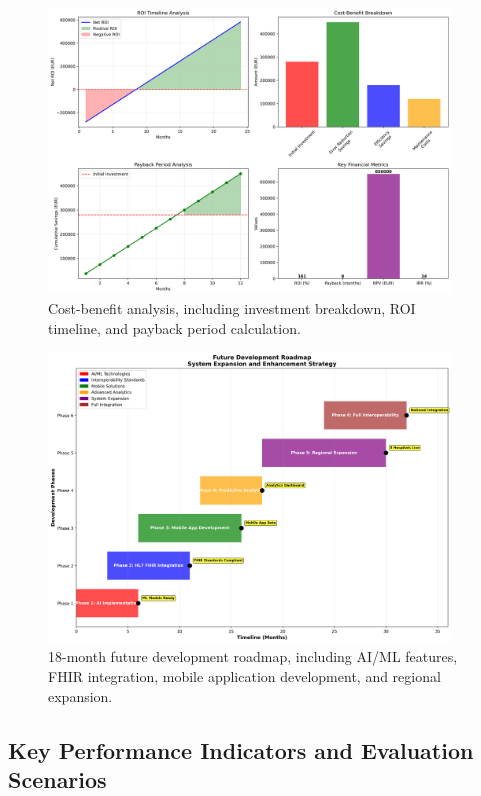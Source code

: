 \begin{figure}[htbp]
    \centering
    \includegraphics[width=0.95\textwidth]{images/generated/roi_analysis.png}
    \caption{Cost-benefit analysis, including investment breakdown, ROI timeline, and payback period calculation.}
    \label{fig:roi-analysis}
\end{figure}

\begin{figure}[htbp]
    \centering
    \includegraphics[width=0.95\textwidth]{images/generated/future_roadmap.png}
    \caption{18-month future development roadmap, including AI/ML features, FHIR integration, mobile application development, and regional expansion.}
    \label{fig:future-roadmap}
\end{figure}

\subsection{Key Performance Indicators and Evaluation Scenarios}
\label{sec:KPIs}

